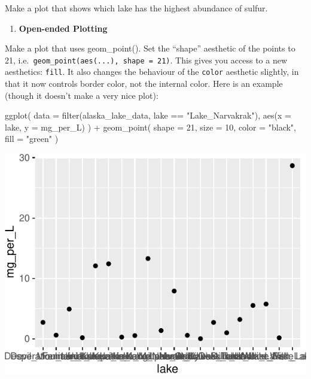 \documentclass[
]{krantz}
\newenvironment{Shaded}{\begin{snugshade}}{\end{snugshade}}
\newcommand{\AttributeTok}[1]{\textcolor[rgb]{0.77,0.63,0.00}{#1}}
\newcommand{\DecValTok}[1]{\textcolor[rgb]{0.00,0.00,0.81}{#1}}
\newcommand{\FunctionTok}[1]{\textcolor[rgb]{0.00,0.00,0.00}{#1}}
\newcommand{\NormalTok}[1]{#1}
\newcommand{\SpecialCharTok}[1]{\textcolor[rgb]{0.00,0.00,0.00}{#1}}
\newcommand{\StringTok}[1]{\textcolor[rgb]{0.31,0.60,0.02}{#1}}
\providecommand{\tightlist}{%
  \setlength{\itemsep}{0pt}\setlength{\parskip}{0pt}}
\begin{document}
Make a plot that shows which lake has the highest abundance of sulfur.

\begin{enumerate}
\def\labelenumi{\arabic{enumi}.}
\setcounter{enumi}{7}
\tightlist
\item
  \textbf{Open-ended Plotting}
\end{enumerate}

Make a plot that uses geom\_point(). Set the ``shape'' aesthetic of the points to 21, i.e.~\texttt{geom\_point(aes(...),\ shape\ =\ 21)}. This gives you access to a new aesthetics: \texttt{fill}. It also changes the behaviour of the \texttt{color} aesthetic slightly, in that it now controls border color, not the internal color. Here is an example (though it doesn't make a very nice plot):

\begin{Shaded}
\begin{Highlighting}[]
\FunctionTok{ggplot}\NormalTok{(}
  \AttributeTok{data =} \FunctionTok{filter}\NormalTok{(alaska\_lake\_data, lake }\SpecialCharTok{==} \StringTok{"Lake\_Narvakrak"}\NormalTok{),}
  \FunctionTok{aes}\NormalTok{(}\AttributeTok{x =}\NormalTok{ lake, }\AttributeTok{y =}\NormalTok{ mg\_per\_L)}
\NormalTok{) }\SpecialCharTok{+}
  \FunctionTok{geom\_point}\NormalTok{(}
    \AttributeTok{shape =} \DecValTok{21}\NormalTok{, }\AttributeTok{size =} \DecValTok{10}\NormalTok{,}
    \AttributeTok{color =} \StringTok{"black"}\NormalTok{, }\AttributeTok{fill =} \StringTok{"green"}
\NormalTok{  )}
\end{Highlighting}
\end{Shaded}

\begin{center}\includegraphics{index_files/figure-latex/unnamed-chunk-52-1} \end{center}
\end{document}
